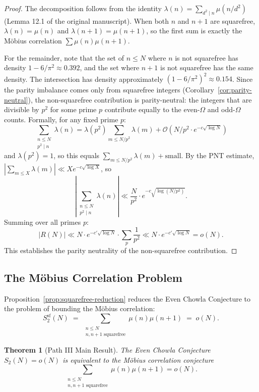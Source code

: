 \documentclass[11pt,a4paper]{article}
\theoremstyle{plain}
\newtheorem{theorem}{Theorem}[section]
\theoremstyle{definition}
\begin{document}
\begin{proof}
The decomposition follows from the identity $\lambda(n) = \sum_{d^2 \mid n} \mu(n/d^2)$ (Lemma 12.1 of the original manuscript). When both $n$ and $n+1$ are squarefree, $\lambda(n) = \mu(n)$ and $\lambda(n+1) = \mu(n+1)$, so the first sum is exactly the M\"obius correlation $\sum \mu(n)\mu(n+1)$.

For the remainder, note that the set of $n \leq N$ where $n$ is not squarefree has density $1 - 6/\pi^2 \approx 0.392$, and the set where $n+1$ is not squarefree has the same density. The intersection has density approximately $(1 - 6/\pi^2)^2 \approx 0.154$. Since the parity imbalance comes only from squarefree integers (Corollary~\ref{cor:parity-neutral}), the non-squarefree contribution is parity-neutral: the integers that are divisible by $p^2$ for some prime $p$ contribute equally to the even-$\Omega$ and odd-$\Omega$ counts. Formally, for any fixed prime $p$:
\[
\sum_{\substack{n \leq N \\ p^2 \mid n}} \lambda(n) = \lambda(p^2) \sum_{m \leq N/p^2} \lambda(m) + \mathcal{O}(N/p^2 \cdot e^{-c\sqrt{\log N}})
\]
and $\lambda(p^2) = 1$, so this equals $\sum_{m \leq N/p^2} \lambda(m) + \text{small}$. By the PNT estimate, $|\sum_{m \leq X} \lambda(m)| \ll X e^{-c\sqrt{\log X}}$, so
\[
\left|\sum_{\substack{n \leq N \\ p^2 \mid n}} \lambda(n)\right| \ll \frac{N}{p^2} \cdot e^{-c\sqrt{\log(N/p^2)}}.
\]
Summing over all primes $p$:
\[
|R(N)| \ll N \cdot e^{-c'\sqrt{\log N}} \cdot \sum_p \frac{1}{p^2} \ll N \cdot e^{-c'\sqrt{\log N}} = o(N).
\]
This establishes the parity neutrality of the non-squarefree contribution.
\end{proof}

\subsection{The M\"obius Correlation Problem}

Proposition~\ref{prop:squarefree-reduction} reduces the Even Chowla Conjecture to the problem of bounding the M\"obius correlation:
\begin{equation}\label{eq:mu-correlation}
S_2^{\mathrm{sf}}(N) \;=\; \sum_{\substack{n \leq N \\ n, n+1 \text{ squarefree}}} \mu(n)\mu(n+1) \;=\; o(N).
\end{equation}

\begin{theorem}[Path III Main Result]\label{thm:path3}
The Even Chowla Conjecture $S_2(N) = o(N)$ is equivalent to the M\"obius correlation conjecture
\begin{equation}\label{eq:mu-conj}
\sum_{\substack{n \leq N \\ n, n+1 \text{ squarefree}}} \mu(n)\mu(n+1) = o(N).
\end{equation}
\end{theorem}
\end{document}
